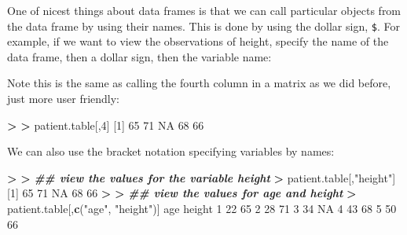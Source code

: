 \documentclass[
]{book}
\newenvironment{Shaded}{\begin{snugshade}}{\end{snugshade}}
\newcommand{\ConstantTok}[1]{\textcolor[rgb]{0.56,0.35,0.01}{#1}}
\newcommand{\DecValTok}[1]{\textcolor[rgb]{0.00,0.00,0.81}{#1}}
\newcommand{\DocumentationTok}[1]{\textcolor[rgb]{0.56,0.35,0.01}{\textbf{\textit{#1}}}}
\newcommand{\ErrorTok}[1]{\textcolor[rgb]{0.64,0.00,0.00}{\textbf{#1}}}
\newcommand{\FunctionTok}[1]{\textcolor[rgb]{0.13,0.29,0.53}{\textbf{#1}}}
\newcommand{\NormalTok}[1]{#1}
\newcommand{\SpecialCharTok}[1]{\textcolor[rgb]{0.81,0.36,0.00}{\textbf{#1}}}
\newcommand{\StringTok}[1]{\textcolor[rgb]{0.31,0.60,0.02}{#1}}
\begin{document}
One of nicest things about data frames is that we can call particular objects from the data frame by using their names. This is done by using the dollar sign, \texttt{\$}. For example, if we want to view the observations of height, specify the name of the data frame, then a dollar sign, then the variable name:

\begin{Shaded}
\end{Shaded}

Note this is the same as calling the fourth column in a matrix as we did before, just more user friendly:

\begin{Shaded}
\begin{Highlighting}[]
\SpecialCharTok{\textgreater{}} 
\ErrorTok{\textgreater{}}\NormalTok{ patient.table[,}\DecValTok{4}\NormalTok{]}
\NormalTok{[}\DecValTok{1}\NormalTok{] }\DecValTok{65} \DecValTok{71} \ConstantTok{NA} \DecValTok{68} \DecValTok{66}
\end{Highlighting}
\end{Shaded}

We can also use the bracket notation specifying variables by names:

\begin{Shaded}
\begin{Highlighting}[]
\SpecialCharTok{\textgreater{}} 
\ErrorTok{\textgreater{}} \DocumentationTok{\#\# view the values for the variable height}
\ErrorTok{\textgreater{}}\NormalTok{ patient.table[,}\StringTok{"height"}\NormalTok{]}
\NormalTok{[}\DecValTok{1}\NormalTok{] }\DecValTok{65} \DecValTok{71} \ConstantTok{NA} \DecValTok{68} \DecValTok{66}
\SpecialCharTok{\textgreater{}} 
\ErrorTok{\textgreater{}} \DocumentationTok{\#\# view the values for age and height}
\ErrorTok{\textgreater{}}\NormalTok{ patient.table[,}\FunctionTok{c}\NormalTok{(}\StringTok{"age"}\NormalTok{, }\StringTok{"height"}\NormalTok{)]}
\NormalTok{  age height}
\DecValTok{1}  \DecValTok{22}     \DecValTok{65}
\DecValTok{2}  \DecValTok{28}     \DecValTok{71}
\DecValTok{3}  \DecValTok{34}     \ConstantTok{NA}
\DecValTok{4}  \DecValTok{43}     \DecValTok{68}
\DecValTok{5}  \DecValTok{50}     \DecValTok{66}
\end{Highlighting}
\end{Shaded}
\end{document}
